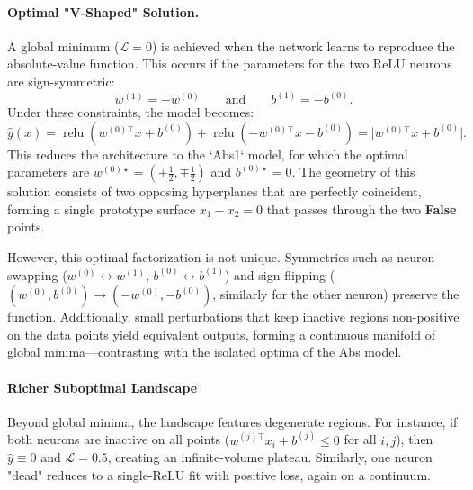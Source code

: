 \paragraph{Optimal "V-Shaped" Solution.}
A global minimum (\(\mathcal{L}=0\)) is achieved when the network learns to reproduce the absolute-value function. This occurs if the parameters for the two ReLU neurons are sign-symmetric:
\[
    w^{(1)} = -w^{(0)} \qquad \text{and} \qquad b^{(1)} = -b^{(0)}.
\]
Under these constraints, the model becomes:
\[
    \hat y(x) = \operatorname{relu}(w^{(0)\!\top}x + b^{(0)}) + \operatorname{relu}(-w^{(0)\!\top}x - b^{(0)}) = \lvert w^{(0)\!\top}x + b^{(0)} \rvert.
\]
This reduces the architecture to the `Abs1` model, for which the optimal parameters are \(w^{(0)\star} = (\pm\tfrac12, \mp\tfrac12)\) and \(b^{(0)\star}=0\). The geometry of this solution consists of two opposing hyperplanes that are perfectly coincident, forming a single prototype surface \(x_1 - x_2 = 0\) that passes through the two \textbf{False} points.

However, this optimal factorization is not unique. Symmetries such as neuron swapping (\(w^{(0)} \leftrightarrow w^{(1)}\), \(b^{(0)} \leftrightarrow b^{(1)}\)) and sign-flipping (\((w^{(0)}, b^{(0)}) \to (-w^{(0)}, -b^{(0)})\), similarly for the other neuron) preserve the function. Additionally, small perturbations that keep inactive regions non-positive on the data points yield equivalent outputs, forming a continuous manifold of global minima—contrasting with the isolated optima of the Abs model.

\paragraph{Richer Suboptimal Landscape}
Beyond global minima, the landscape features degenerate regions. For instance, if both neurons are inactive on all points (\(w^{(j)\!\top}x_i + b^{(j)} \leq 0\) for all \(i,j\)), then \(\hat{y} \equiv 0\) and \(\mathcal{L} = 0.5\), creating an infinite-volume plateau. Similarly, one neuron "dead" reduces to a single-ReLU fit with positive loss, again on a continuum.

